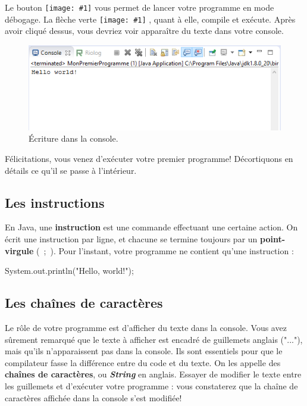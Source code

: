 \documentclass[12pt]{report}
\newcommand{\inlinepic}[1]{%
  \begingroup\normalfont
  \texttt{[image: \#1]}%
  \endgroup
}
\begin{document}
%
Le bouton \inlinepic{debug-btn-eclipse.png} vous permet de lancer votre programme en mode débogage. La flèche verte \inlinepic{execute-btn-eclipse.png}, quant à elle, compile et exécute. Après avoir cliqué dessus, vous devriez voir apparaître du texte dans votre console.
%
%
\begin{figure}[!ht]
	\centering
	\includegraphics[scale=1]{ecriture-console.png}
	\caption{Écriture dans la console.}
\end{figure}

Félicitations, vous venez d'exécuter votre premier programme! Décortiquons en détails ce qu'il se passe à l'intérieur.






%
\subsection{Les instructions}
En Java, une \textbf{instruction} est une commande effectuant une certaine action. On écrit une instruction par ligne, et chacune se termine toujours par un \textbf{point-virgule} (\ {;}\ ). Pour l'instant, votre programme ne contient qu'une instruction : 
\begin{code}
System.out.println("Hello, world!");
\end{code}






%
\subsection{Les chaînes de caractères}
%
Le rôle de votre programme est d'afficher du texte dans la console. Vous avez sûrement remarqué que le texte à afficher est encadré de guillemets anglais ("..."), mais qu'ils n'apparaissent pas dans la console. Ils sont essentiels pour que le compilateur fasse la différence entre du code et du texte. On les appelle des \textbf{chaînes de caractères}, ou \emph{\bfseries String} en anglais. Essayer de modifier le texte entre les guillemets et d'exécuter votre programme : vous constaterez que la chaîne de caractères affichée dans la console s'est modifiée!
\end{document}

